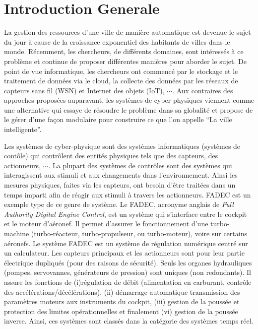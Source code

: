 \part*{Introduction Generale}
La gestion des ressources d'une ville de manière automatique est
devenue le sujet du jour à cause de la croissance exponentiel des
habitants de villes dans le monde. Récemment, les chercheurs, de
différents domaines, sont intéressés à ce problème et continue de
proposer différentes manières pour aborder le sujet. De point de vue
informatique, les chercheurs ont commencé par le stockage et le
traitement de données via le cloud, la collecte des données par les
réseaux de capteurs sans fil (WSN) et Internet des objets (IoT),
$\cdots$. Aux contraires des approches proposées auparavant, les
systèmes de cyber physiques viennent comme une alternative qui essaye
de résoudre le problème dans sa globalité et propose de le gérer d'une
façon modulaire pour construire ce que l'on appelle ``La ville
intelligente''.

Les systèmes de cyber-physique sont des systèmes informatiques
(systèmes de cont\^ole) qui contrôlent des entités physiques tels que
des capteurs, des actionneurs, $\cdots$. La plupart des systèmes de
contr\^oles sont des systèmes qui interagissent aux stimuli et aux
changements dans l'environnement. Ainsi les mesures physiques, faites
via les capteurs, ont besoin d'être traitées dans un temps imparti
afin de réagir aux stimuli à travers les actionneurs. FADEC\cite{} est
un exemple type de ce genre de système. Le FADEC, acronyme anglais de
\emph{Full Authority Digital Engine Control}, est un système qui
s'interface entre le cockpit et le moteur d'aéronef. Il permet
d'assurer le fonctionnement d'une turbo-machine (turbo-réacteur,
turbo-propulseur, ou turbo-moteur), voire sur certains aéronefs. Le
système FADEC est un système de régulation numérique centré sur un
calculateur. Les capteurs principaux et les actionneurs sont pour leur
partie électrique dupliqués (pour des raisons de sécurité). Seuls les
organes hydrauliques (pompes, servovannes, générateurs de pression)
sont uniques (non redondants).  Il assure les fonctions de
(i)régulation de débit (alimentation en carburant, contrôle des
accélérations/décélérations), (ii) démarrage automatique transmission
des paramètres moteurs aux instruments du cockpit, (iii) gestion de la
poussée et protection des limites opérationnelles et finalement (vi)
gestion de la poussée inverse. Ainsi, ces systèmes sont classés dans
la catégorie des systèmes temps réel.

